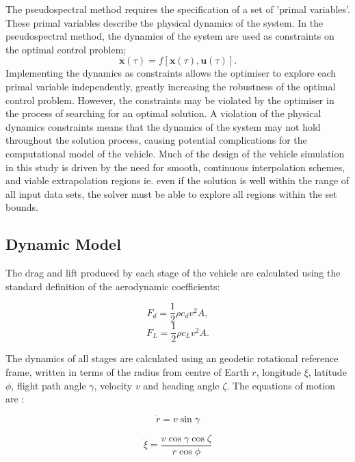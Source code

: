 The pseudospectral method requires the specification of a set of 'primal variables'. These primal variables describe the physical dynamics of the system. In the pseudospectral method, the dynamics of the system are used as constraints on the optimal control problem;
\begin{equation} \label{eq:state2}
\dot{\textbf{x}}(\tau) = f[\textbf{x}(\tau),\textbf{u}(\tau)].
\end{equation}
Implementing the dynamics as constraints allows the optimiser to explore each primal variable independently, greatly increasing the robustness of the optimal control problem. However, the constraints may be violated by the optimiser in the process of searching for an optimal solution. A violation of the physical dynamics constraints means that the dynamics of the system may not hold throughout the solution process, causing potential complications for the computational model of the vehicle. Much of the design of the vehicle simulation in this study is driven by the need for smooth, continuous interpolation schemes, and viable extrapolation regions ie. even if the solution is well within the range of all input data sets, the solver must be able to explore all regions within the set bounds. 

\subsection{Dynamic Model}
The drag and lift produced by each stage of the vehicle are calculated using the standard definition of the aerodynamic coefficients:

\begin{equation}
F_d = \frac{1}{2}\rho c_d v^2 A ,
\end{equation}
\begin{equation}
F_L = \frac{1}{2}\rho c_L v^2 A .
\end{equation}

The dynamics of all stages are calculated using an geodetic rotational reference frame, written in terms of the radius from centre of Earth $r$, longitude $\xi$, latitude $\phi$, flight path angle $\gamma$, velocity $v$ and heading angle $\zeta$. The equations of motion are \cite{Josselyn2002a}:


\begin{equation}
\dot{r} = v \sin \gamma
\end{equation}

\begin{equation}
\dot{\xi} = \frac{v\cos \gamma \cos \zeta}{r \cos \phi}
\end{equation}

